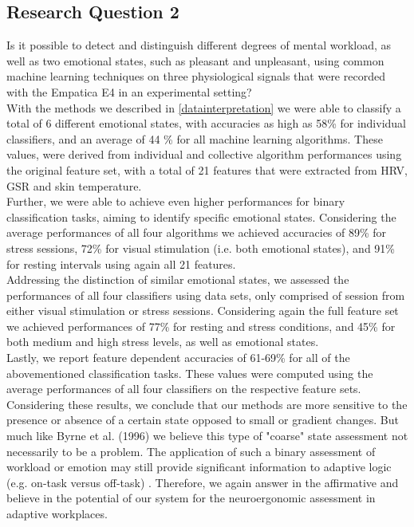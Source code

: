 \subsection{Research Question 2}  
Is it possible to detect and distinguish different degrees of mental workload, as well as two emotional states, such as pleasant and unpleasant, using common machine learning techniques on three physiological signals that were recorded with the Empatica E4 in an experimental setting?\\[10pt]
With the methods we described in \ref{datainterpretation} we were able to classify a total of 6 different emotional states, with accuracies as high as 58\% for individual classifiers, and an average of 44 \% for all machine learning algorithms. These values, were derived from individual and collective algorithm performances using the original feature set, with a total of 21 features that were extracted from HRV, GSR and skin temperature.\\
Further, we were able to achieve even higher performances for binary classification tasks, aiming to identify specific emotional states. Considering the average performances of all four algorithms we achieved accuracies of 89\% for stress sessions, 72\% for visual stimulation (i.e. both emotional states), and 91\% for resting intervals using again all 21 features.\\
Addressing the distinction of similar emotional states, we assessed the performances of all four classifiers using data sets, only comprised of session from either visual stimulation or stress sessions. Considering again the full feature set we achieved performances of 77\% for resting and stress conditions, and 45\% for both medium and high stress levels, as well as emotional states.\\
Lastly, we report feature dependent accuracies of 61-69\% for all of the abovementioned classification tasks. These values were computed using the average performances of all four classifiers on the respective feature sets.\\
Considering these results, we conclude that our methods are more sensitive to the presence or absence of a certain state opposed to small or gradient changes. But much like Byrne et al. (1996) we believe this type of "coarse" state assessment not necessarily to be a problem. The application of such a binary assessment of workload or emotion may still provide significant information to adaptive logic (e.g. on-task versus off-task) \cite{Byrne1996}. Therefore, we again answer in the affirmative and believe in the potential of our system for the neuroergonomic assessment in adaptive workplaces. 


